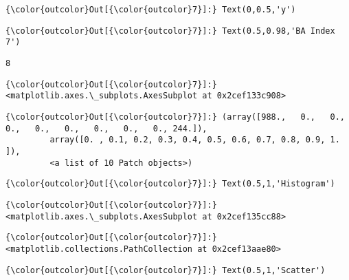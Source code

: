 \documentclass[11pt]{article}
\begin{document}
\begin{Verbatim}[commandchars=\\\{\}]
{\color{outcolor}Out[{\color{outcolor}7}]:} Text(0,0.5,'y')
\end{Verbatim}
            
\begin{Verbatim}[commandchars=\\\{\}]
{\color{outcolor}Out[{\color{outcolor}7}]:} Text(0.5,0.98,'BA Index 7')
\end{Verbatim}
            
    \begin{Verbatim}[commandchars=\\\{\}]
8

    \end{Verbatim}

\begin{Verbatim}[commandchars=\\\{\}]
{\color{outcolor}Out[{\color{outcolor}7}]:} <matplotlib.axes.\_subplots.AxesSubplot at 0x2cef133c908>
\end{Verbatim}
            
\begin{Verbatim}[commandchars=\\\{\}]
{\color{outcolor}Out[{\color{outcolor}7}]:} (array([988.,   0.,   0.,   0.,   0.,   0.,   0.,   0.,   0., 244.]),
         array([0. , 0.1, 0.2, 0.3, 0.4, 0.5, 0.6, 0.7, 0.8, 0.9, 1. ]),
         <a list of 10 Patch objects>)
\end{Verbatim}
            
\begin{Verbatim}[commandchars=\\\{\}]
{\color{outcolor}Out[{\color{outcolor}7}]:} Text(0.5,1,'Histogram')
\end{Verbatim}
            
\begin{Verbatim}[commandchars=\\\{\}]
{\color{outcolor}Out[{\color{outcolor}7}]:} <matplotlib.axes.\_subplots.AxesSubplot at 0x2cef135cc88>
\end{Verbatim}
            
\begin{Verbatim}[commandchars=\\\{\}]
{\color{outcolor}Out[{\color{outcolor}7}]:} <matplotlib.collections.PathCollection at 0x2cef13aae80>
\end{Verbatim}
            
\begin{Verbatim}[commandchars=\\\{\}]
{\color{outcolor}Out[{\color{outcolor}7}]:} Text(0.5,1,'Scatter')
\end{Verbatim}
            
\end{document}
